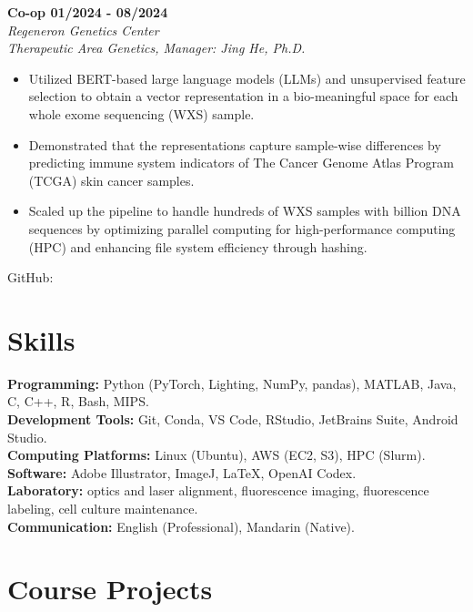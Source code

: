 \documentclass[letterpaper, 11pt]{article}
\begin{document}
    \textbf{Co-op \hfill 01/2024 - 08/2024} \\
    \textit{Regeneron Genetics Center} \\
    \textit{Therapeutic Area Genetics, Manager: Jing He, Ph.D.}
    \begin{itemize}
        \item Utilized BERT-based large language models (LLMs) and unsupervised feature selection to obtain a vector representation in a bio-meaningful space for each whole exome sequencing (WXS) sample.
        \item Demonstrated that the representations capture sample-wise differences by predicting immune system indicators of The Cancer Genome Atlas Program (TCGA) skin cancer samples.
        \item Scaled up the pipeline to handle hundreds of WXS samples with billion DNA sequences by optimizing parallel computing for high-performance computing (HPC) and enhancing file system efficiency through hashing.
    \end{itemize}
    GitHub: \href{https://github.com/tianrui-qi/SIP-DB2}{}


\section{Skills}


    \textbf{Programming:} Python (PyTorch, Lighting, NumPy, pandas), MATLAB, Java, C, C++, R, Bash, MIPS. \\
    \textbf{Development Tools:} Git, Conda, VS Code, RStudio, JetBrains Suite, Android Studio. \\
    \textbf{Computing Platforms:} Linux (Ubuntu), AWS (EC2, S3), HPC (Slurm). \\
    \textbf{Software:} Adobe Illustrator, ImageJ, LaTeX, OpenAI Codex. \\
    \textbf{Laboratory:} optics and laser alignment, fluorescence imaging, fluorescence labeling, cell culture maintenance. \\
    \textbf{Communication:} English (Professional), Mandarin (Native).


\section{Course Projects}
\end{document}
